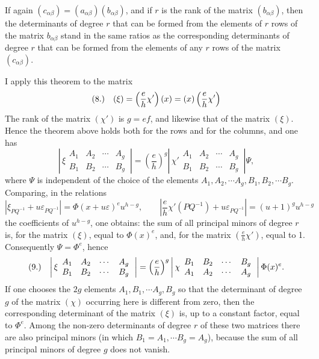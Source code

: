 \documentclass[11pt]{article}
\makeatletter
\newcommand{\frobtag}[2]{\[\begin{array}{@{}r@{\quad}l@{}}\textup{(#1)} & \displaystyle #2\end{array}\]}
\newcommand{\frobtagc}[2]{\[\begin{array}{@{}r@{\quad}c@{}}\textup{(#1)} & \displaystyle #2\end{array}\]}
\makeatother
\begin{document}
If again $(c_{\alpha\beta})=(a_{\alpha\beta})(b_{\alpha\beta})$, and if $r$ is the rank of the matrix $(b_{\alpha\beta})$, then the determinants of degree $r$ that can be formed from the elements of $r$ rows of the matrix $b_{\alpha\beta}$ stand in the same ratios as the corresponding determinants of degree $r$ that can be formed from the elements of any $r$ rows of the matrix $(c_{\alpha\beta})$.

I apply this theorem to the matrix
\frobtagc{8.}{(\xi)=\left(\frac{e}{h}\chi'\right)(x)=(x)\left(\frac{e}{h}\chi'\right)}
The rank of the matrix $(\chi')$ is $g=ef$, and likewise that of the matrix $(\xi)$. Hence the theorem above holds both for the rows and for the columns, and one has
\[
\left|\,\xi\begin{array}{cccc}
A_1&A_2&\cdots&A_g\\
B_1&B_2&\cdots&B_g
\end{array}\,\right|
=\left(\frac{e}{h}\right)^g
\left|\,\chi'\begin{array}{cccc}
A_1&A_2&\cdots&A_g\\
B_1&B_2&\cdots&B_g
\end{array}\,\right|\Psi,
\]
where $\Psi$ is independent of the choice of the elements $A_1,A_2,\cdots A_g,B_1,B_2,\cdots B_g$. Comparing, in the relations
\[
\left|\xi_{PQ^{-1}}+u\varepsilon_{PQ^{-1}}\right|=\Phi(x+u\varepsilon)^e u^{h-g},\qquad
\left|\frac{e}{h}\chi'(PQ^{-1})+u\varepsilon_{PQ^{-1}}\right|=(u+1)^g u^{h-g}
\]
the coefficients of $u^{h-g}$, one obtains: the sum of all principal minors of degree $r$ is, for the matrix $(\xi)$, equal to $\Phi(x)^e$, and, for the matrix $\left(\frac{e}{h}\chi'\right)$, equal to 1. Consequently $\Psi=\Phi^e$, hence
\frobtag{9.}{\left|\,\xi\begin{array}{cccc}
A_1&A_2&\cdots&A_g\\
B_1&B_2&\cdots&B_g
\end{array}\,\right|
=\left(\frac{e}{h}\right)^g
\left|\,\chi\begin{array}{cccc}
B_1&B_2&\cdots&B_g\\
A_1&A_2&\cdots&A_g
\end{array}\,\right|\Phi(x)^e.}
If one chooses the $2g$ elements $A_1,B_1,\cdots A_g,B_g$ so that the determinant of degree $g$ of the matrix $(\chi)$ occurring here is different from zero, then the corresponding determinant of the matrix $(\xi)$ is, up to a constant factor, equal to $\Phi^e$. Among the non-zero determinants of degree $r$ of these two matrices there are also principal minors (in which $B_1=A_1,\cdots B_g=A_g$), because the sum of all principal minors of degree $g$ does not vanish.
\end{document}
